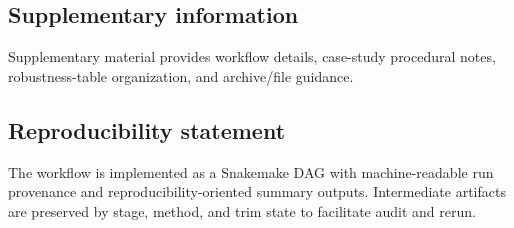 \documentclass[11pt]{article}
\begin{document}
\subsection{Supplementary information}
Supplementary material provides workflow details, case-study procedural notes, robustness-table organization, and archive/file guidance.

\subsection{Reproducibility statement}
The workflow is implemented as a Snakemake DAG with machine-readable run provenance and reproducibility-oriented summary outputs.
Intermediate artifacts are preserved by stage, method, and trim state to facilitate audit and rerun.



\end{document}
